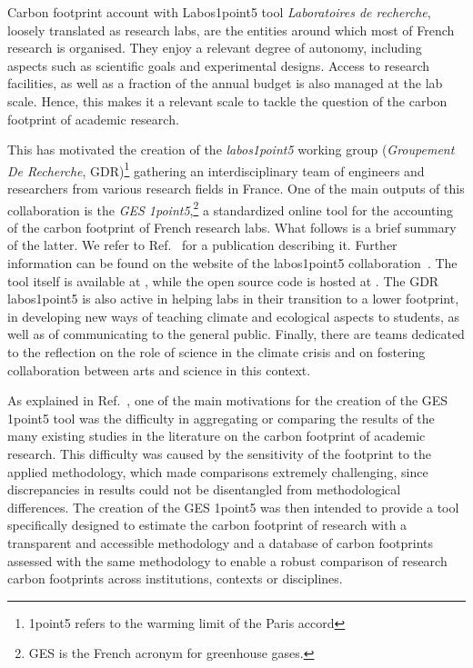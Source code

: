 \documentclass[../SustainableHEP.tex]{subfiles}
\begin{document}
\begin{bestpractice}
{Carbon footprint account with Labos1point5 tool}%
\noindent \emph{Laboratoires de recherche}, loosely translated as research labs,
are the entities around which most of French research is organised.
They enjoy a relevant degree of autonomy, including 
aspects such as scientific goals and experimental designs. 
Access to research facilities, as well as 
a fraction of the annual budget is also managed at the lab scale.
Hence, this makes it a relevant scale to tackle the question 
of the carbon footprint of academic research. 

This has motivated the creation of the \emph{labos1point5} 
working group (\emph{Groupement De Recherche}, GDR)\footnote{1point5
refers to the warming limit of the Paris accord} 
gathering an interdisciplinary team of engineers and researchers from various research fields in France. 
One of the main outputs of this collaboration is the \emph{GES 1point5},\footnote{GES
is the French acronym for greenhouse gases.} a
standardized online tool for the accounting of the carbon 
footprint of French research labs. What follows is a brief
summary of the latter. We refer to Ref.~\cite{labos1p5}
for a publication describing it. Further information 
can be found on the website of the labos1point5 collaboration~\cite{labos1p5web}. The tool itself is available at \cite{ges1p5}, 
while the open source code is hosted at \cite{ges1p5git}.
The GDR labos1point5 is also active in helping labs in their
transition to a lower footprint, in developing new ways of 
teaching climate and ecological aspects to students, as well
as of communicating to the general public. Finally,
there are  teams dedicated to the reflection on the role
of science in the climate crisis and on fostering collaboration 
between arts and science in this context.

As explained in Ref.~\cite{labos1p5}, one of the main motivations for the 
creation of the GES 1point5 tool was the difficulty in aggregating or comparing the results of 
the many existing studies in the literature on the carbon footprint of academic research.
This difficulty was caused by the sensitivity of the footprint to the applied 
methodology, which made comparisons extremely challenging, since discrepancies in results
could not be disentangled from methodological differences. 
The creation of the GES 1point5 was then intended to provide 
a tool specifically designed to estimate the carbon footprint of research with a transparent
and accessible methodology and a database of carbon footprints assessed with the same
methodology to enable a robust comparison of research carbon footprints across institutions,
contexts or disciplines.


\end{bestpractice}
\end{document}
